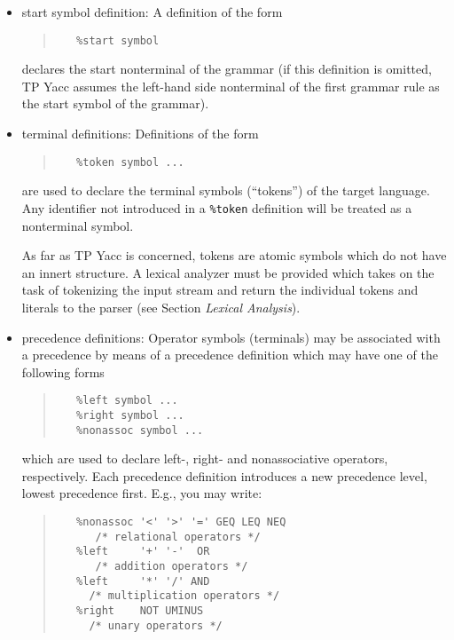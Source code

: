 \begin{itemize}
   \item
      start symbol definition: A definition of the form
      \begin{quote}\begin{verbatim}
   %start symbol
      \end{verbatim}\end{quote}
      declares the start nonterminal of the grammar (if this definition is
      omitted, TP Yacc assumes the left-hand side nonterminal of the first
      grammar rule as the start symbol of the grammar).
   \item
      terminal definitions: Definitions of the form
      \begin{quote}\begin{verbatim}
   %token symbol ...
      \end{verbatim}\end{quote}
      are used to declare the terminal symbols (``tokens'') of the target
      language. Any identifier not introduced in a \verb"%token" definition
      will be treated as a nonterminal symbol.
    
      As far as TP Yacc is concerned, tokens are atomic symbols which do not
      have an innert structure. A lexical analyzer must be provided which
      takes on the task of tokenizing the input stream and return the
      individual tokens and literals to the parser (see Section {\em Lexical
      Analysis\/}).
   \item
      precedence definitions: Operator symbols (terminals) may be associated
      with a precedence by means of a precedence definition which may have
      one of the following forms
      \begin{quote}\begin{verbatim}
   %left symbol ...
   %right symbol ...
   %nonassoc symbol ...
      \end{verbatim}\end{quote}
      which are used to declare left-, right- and nonassociative operators,
      respectively. Each precedence definition introduces a new precedence
      level, lowest precedence first. E.g., you may write:
      \begin{quote}\begin{verbatim}
   %nonassoc '<' '>' '=' GEQ LEQ NEQ
      /* relational operators */
   %left     '+' '-'  OR
      /* addition operators */
   %left     '*' '/' AND
     /* multiplication operators */
   %right    NOT UMINUS
     /* unary operators */
      \end{verbatim}\end{quote}


\end{itemize}
